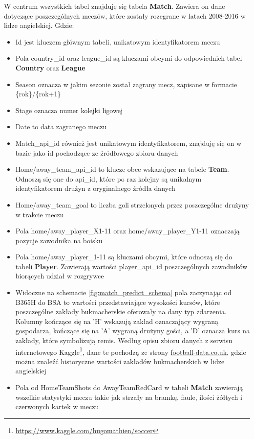 W centrum wszystkich tabel znajduję się tabela \textbf{Match}. Zawiera on dane dotyczące poszczególnych meczów, które zostały rozegrane w latach 2008-2016 w lidze angielskiej. Gdzie: 
\begin{itemize}
    \item Id jest kluczem głównym tabeli, unikatowym identyfikatorem meczu
    
    \item Pola country\_id oraz league\_id są kluczami obcymi do odpowiednich tabel \textbf{Country} oraz \textbf{League}
    
    \item Season oznacza w jakim sezonie został zagrany mecz, zapisane w formacie \{rok\}/\{rok+1\}
    
    \item Stage oznacza numer kolejki ligowej
    
    \item Date to data zagranego meczu
    
    \item Match\_api\_id również jest unikatowym identyfikatorem, znajduję się on w bazie jako id pochodzące ze źródłowego zbioru danych
    
    \item Home/away\_team\_api\_id to klucze obce wskazujące na tabele \textbf{Team}. Odnoszą się one do api\_id, które po raz kolejny są unikalnym identyfikatorem drużyn z oryginalnego źródła danych
    
    \item Home/away\_team\_goal to liczba goli strzelonych przez poszczególne drużyny w trakcie meczu
    
    \item Pola home/away\_player\_X1-11 oraz home/away\_player\_Y1-11 oznaczają pozycje zawodnika na boisku
    
    \item Pola home/away\_player\_1-11 są kluczami obcymi, które odnoszą się do tabeli \textbf{Player}. Zawierają wartości player\_api\_id poszczególnych zawodników biorących udział w rozgrywce
    
    \item Widoczne na schemacie \ref{fig:match_predict_schema} pola zaczynając od B365H do BSA to wartości przedstawiające wysokości kursów, które poszczególne zakłady bukmacherskie oferowały na dany typ zdarzenia. Kolumny kończące się na 'H' wskazują zakład oznaczający wygraną gospodarza, kończące się na 'A' wygraną drużyny gości, a 'D' oznacza kurs na zakłady, które symbolizują remis. Według opisu zbioru danych z serwisu internetowego Kaggle\footnote{\url{https://www.kaggle.com/hugomathien/soccer}}, dane te pochodzą ze strony \url{football-data.co.uk}, gdzie można znaleźć historyczne wartości zakładów bukmacherskich w lidze angielskiej
    
    \item Pola od HomeTeamShots do AwayTeamRedCard w tabeli \textbf{Match} zawierają wszelkie statystyki meczu takie jak strzały na bramkę, faule, ilości żółtych i czerwonych kartek w meczu
\end{itemize}

